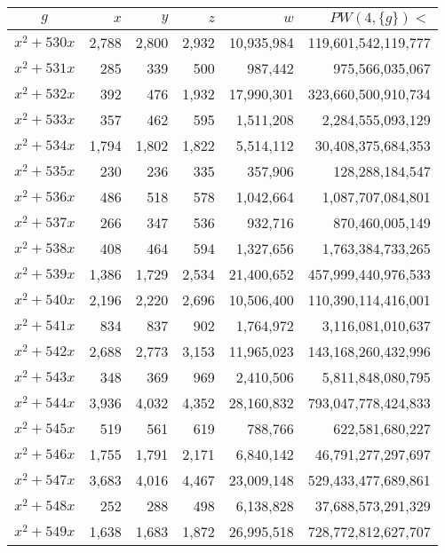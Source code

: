\documentclass{article}
\begin{document}
\begin{center}
\begin{tabular}{ | c | r | r | r | r | r | }
$g$ & $x$ & $y$ & $z$ & $w$ & $PW(4, \{g\}) <$ \\ \hline
$x^2 + 530x$ & 2{,}788 & 2{,}800 & 2{,}932 & 10{,}935{,}984 & 119{,}601{,}542{,}119{,}777 \\ \hline
$x^2 + 531x$ & 285 & 339 & 500 & 987{,}442 & 975{,}566{,}035{,}067 \\ \hline
$x^2 + 532x$ & 392 & 476 & 1{,}932 & 17{,}990{,}301 & 323{,}660{,}500{,}910{,}734 \\ \hline
$x^2 + 533x$ & 357 & 462 & 595 & 1{,}511{,}208 & 2{,}284{,}555{,}093{,}129 \\ \hline
$x^2 + 534x$ & 1{,}794 & 1{,}802 & 1{,}822 & 5{,}514{,}112 & 30{,}408{,}375{,}684{,}353 \\ \hline
$x^2 + 535x$ & 230 & 236 & 335 & 357{,}906 & 128{,}288{,}184{,}547 \\ \hline
$x^2 + 536x$ & 486 & 518 & 578 & 1{,}042{,}664 & 1{,}087{,}707{,}084{,}801 \\ \hline
$x^2 + 537x$ & 266 & 347 & 536 & 932{,}716 & 870{,}460{,}005{,}149 \\ \hline
$x^2 + 538x$ & 408 & 464 & 594 & 1{,}327{,}656 & 1{,}763{,}384{,}733{,}265 \\ \hline
$x^2 + 539x$ & 1{,}386 & 1{,}729 & 2{,}534 & 21{,}400{,}652 & 457{,}999{,}440{,}976{,}533 \\ \hline
$x^2 + 540x$ & 2{,}196 & 2{,}220 & 2{,}696 & 10{,}506{,}400 & 110{,}390{,}114{,}416{,}001 \\ \hline
$x^2 + 541x$ & 834 & 837 & 902 & 1{,}764{,}972 & 3{,}116{,}081{,}010{,}637 \\ \hline
$x^2 + 542x$ & 2{,}688 & 2{,}773 & 3{,}153 & 11{,}965{,}023 & 143{,}168{,}260{,}432{,}996 \\ \hline
$x^2 + 543x$ & 348 & 369 & 969 & 2{,}410{,}506 & 5{,}811{,}848{,}080{,}795 \\ \hline
$x^2 + 544x$ & 3{,}936 & 4{,}032 & 4{,}352 & 28{,}160{,}832 & 793{,}047{,}778{,}424{,}833 \\ \hline
$x^2 + 545x$ & 519 & 561 & 619 & 788{,}766 & 622{,}581{,}680{,}227 \\ \hline
$x^2 + 546x$ & 1{,}755 & 1{,}791 & 2{,}171 & 6{,}840{,}142 & 46{,}791{,}277{,}297{,}697 \\ \hline
$x^2 + 547x$ & 3{,}683 & 4{,}016 & 4{,}467 & 23{,}009{,}148 & 529{,}433{,}477{,}689{,}861 \\ \hline
$x^2 + 548x$ & 252 & 288 & 498 & 6{,}138{,}828 & 37{,}688{,}573{,}291{,}329 \\ \hline
$x^2 + 549x$ & 1{,}638 & 1{,}683 & 1{,}872 & 26{,}995{,}518 & 728{,}772{,}812{,}627{,}707 \\ \hline

\end{tabular}
\end{center}
\end{document}

